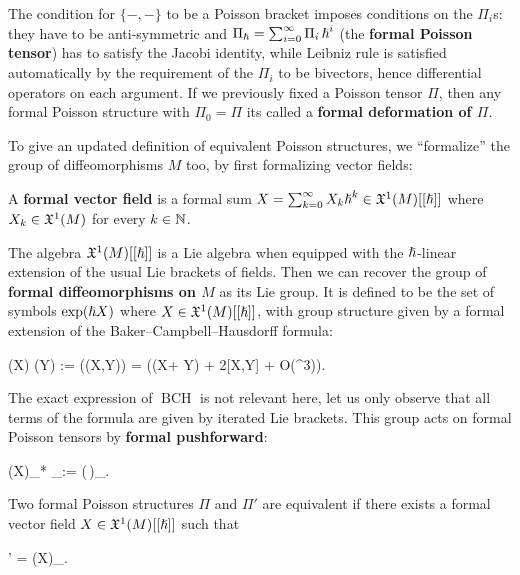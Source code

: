 \documentclass[main.tex]{subfiles}
\begin{document}
\begin{remark}
	The condition for $\{-,-\}$ to be a Poisson bracket imposes conditions on the $\Pi_i$s: they have to be anti-symmetric and $\Pi_{\boldsymbol\hslash} = \sum_{i = 0}^\infty \Pi_i\, {\boldsymbol\hslash}^i$ (the \textbf{formal Poisson tensor}) has to satisfy the Jacobi identity, while Leibniz rule is satisfied automatically by the requirement of the $\Pi_i$ to be bivectors, hence differential operators on each argument. If we previously fixed a Poisson tensor $\Pi$, then any formal Poisson structure with $\Pi_0 = \Pi$ its called a \textbf{formal deformation of $\Pi$}.
\end{remark}

To give an updated definition of equivalent Poisson structures, we ``formalize'' the group of diffeomorphisms $M$ too, by first formalizing vector fields:

\begin{definition}
	A \textbf{formal vector field} is a formal sum $X = \sum_{k = 0}^\infty X_k {\boldsymbol\hslash}^k \in \mathfrak{X}^1(M)[[{\boldsymbol\hslash}]]$ where $X_k \in \mathfrak{X}^1(M)$ for every $k \in \mathbb{N}$.
\end{definition}

The algebra $\mathfrak{X}^1(M)[[{\boldsymbol\hslash}]]$ is a Lie algebra when equipped with the ${\boldsymbol\hslash}$-linear extension of the usual Lie brackets of fields. Then we can recover the group of \textbf{formal diffeomorphisms on $M$} as its Lie group. It is defined to be the set of symbols $\operatorname{exp}({\boldsymbol\hslash} X)$ where $X \in \mathfrak{X}^1(M)[[{\boldsymbol\hslash}]]$, with group structure given by a formal extension of the Baker--Campbell--Hausdorff formula:
\begin{eqalign}
	\exp(\planck X) \cdot \exp(\planck Y) := \exp\left(\planck {}(X,Y)\right) = \exp(\planck (X+ Y) + 2[X,Y] + O(\planck^3)).
\end{eqalign}
The exact expression of $\operatorname{BCH}$ is not relevant here, let us only observe that all terms of the formula are given by iterated Lie brackets. This group acts on formal Poisson tensors by \textbf{formal pushforward}:
\begin{eqalign}
	\exp(\planck X)_* \Pi_\planck := \exp(\planck\,)\Pi_\planck.
\end{eqalign}

\begin{definition}
	Two formal Poisson structures $\Pi$ and $\Pi'$ are equivalent if there exists a formal vector field $X \in \mathfrak{X}^1(M)[[{\boldsymbol\hslash}]]$ such that
	\begin{eqalign}
		\Pi' = \exp(\planck X)_\star \Pi.
	\end{eqalign}
\end{definition}
\end{document}
